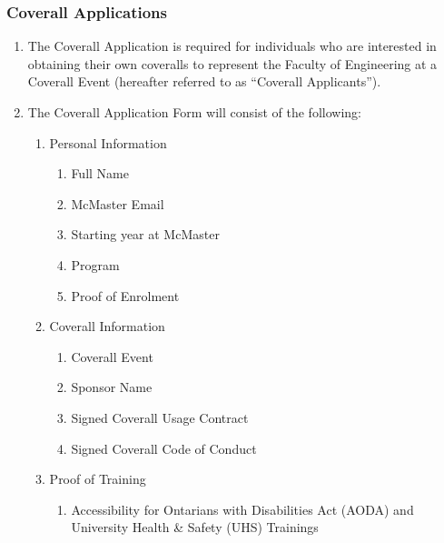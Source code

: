 \subsubsection{Coverall Applications}
\label{coverall-applications}
\begin{enumerate}
 \item
  The Coverall Application is required for individuals who are
  interested in obtaining their own coveralls to represent the Faculty
  of Engineering at a Coverall Event (hereafter referred to as
  ``Coverall Applicants'').
 \item
  The Coverall Application Form will consist of the following:

  \begin{enumerate}
   \item
    Personal Information

    \begin{enumerate}
     \item
      Full Name
     \item
      McMaster Email
     \item
      Starting year at McMaster
     \item
      Program
     \item
      Proof of Enrolment
    \end{enumerate}
   \item
    Coverall Information

    \begin{enumerate}
     \item
      Coverall Event
     \item
      Sponsor Name
     \item
      Signed Coverall Usage Contract
     \item
      Signed Coverall Code of Conduct
    \end{enumerate}
   \item
    Proof of Training

    \begin{enumerate}
     \item
      Accessibility for Ontarians with Disabilities Act (AODA) and
      University Health \& Safety (UHS) Trainings


\end{enumerate}
\end{enumerate}
\end{enumerate}
